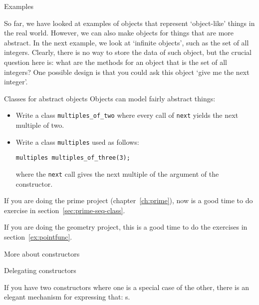  {Examples}

So far, we have looked at examples of objects that represent
`object-like' things in the real world.
However, we can also make objects for things
that are more abstract.
In the next example, we look at `infinite objects',
such as the set of all integers.
Clearly, there is no way to store the data of such object,
but the crucial question here is: what are the methods
for an object that is the set of all integers?
One possible design is that you could ask this object
`give me the next integer'.

\begin{block}{Classes for abstract objects}
  \label{sl:intstream}
  Objects can model fairly abstract things:
\end{block}

\begin{exercise}
  \label{ex:mult-two}
  \begin{itemize}
  \item
    Write a class \lstinline{multiples_of_two} where every call of
    \lstinline{next} yields the next multiple of two. 
  \item Write a class \lstinline{multiples} used as follows:
\begin{lstlisting}
multiples multiples_of_three(3);      
\end{lstlisting}
  where the \lstinline{next} call gives the next multiple of the
  argument of the constructor.
  \end{itemize}
\end{exercise}

\begin{exercise}
  If you are doing the prime project (chapter~\ref{ch:prime}),
  now is a good time to do exercise in section~\ref{sec:prime-seq-class}.
\end{exercise}



\begin{exercise}
  If you are doing the geometry project,
  this is a good time to do the exercises in section~\ref{ex:pointfunc}.
\end{exercise}

 {More about constructors}

 {Delegating constructors}
\label{sec:construct-delegate}

If you have two constructors where one is a special case of the other,
there is an elegant mechanism for expressing that:
s.

